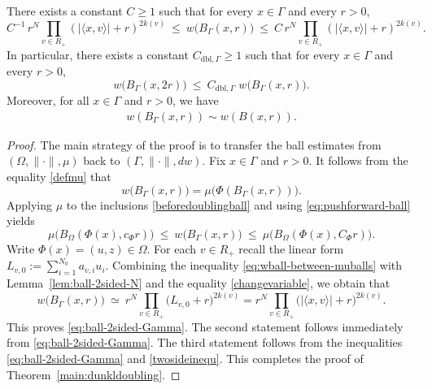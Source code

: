 \documentclass[12pt]{amsart}
\begin{document}
\begin{theorem}\label{main:dunkldoubling}
There exists a constant $C\ge 1$ such that
for every $x\in\Gamma$ and every $r>0$,
\begin{equation}\label{eq:ball-2sided-Gamma}
C^{-1}\,r^N \prod_{v \in R_+}(|\langle x, v \rangle |+r)^{2k(v)}
\ \le\
w\big(B_\Gamma(x,r)\big)
\ \le\
C\,r^N \prod_{v \in R_+}(|\langle x, v \rangle |+r)^{2k(v)}.
\end{equation}
In particular, there exists a constant $C_{\mathrm{dbl},\Gamma}\geq 1$ such that for every $x\in\Gamma$ and every $r>0$,
\[
w\big(B_\Gamma(x,2r)\big)\ \le\ C_{\mathrm{dbl},\Gamma}\;w\big(B_\Gamma(x,r)\big).
\]
Moreover, for all $x\in\Gamma$ and $r>0$, we have
\begin{align}\label{globallocalvol}
w(B_\Gamma(x,r))\sim w(B(x,r)).
\end{align}
\end{theorem}
\begin{proof}
The main strategy of the proof is to transfer the ball estimates from $(\Omega,\|\cdot\|,\mu)$ back to $(\Gamma,\|\cdot\|,dw)$. Fix $x\in\Gamma$ and $r>0$. It follows from the equality \eqref{defmu} that
\begin{equation}\label{eq:pushforward-ball}
w\big(B_\Gamma(x,r)\big)=\mu\big(\Phi(B_\Gamma(x,r))\big).
\end{equation}
Applying $\mu$ to the inclusions \eqref{beforedoublingball} and using \eqref{eq:pushforward-ball} yields
\begin{equation}\label{eq:wball-between-muballs}
\mu\big(B_{\Omega}(\Phi(x),c_\Phi r)\big)
\ \le\
w\big(B_\Gamma(x,r)\big)
\ \le\
\mu\big(B_{\Omega}(\Phi(x),C_\Phi r)\big).
\end{equation}
Write $\Phi(x)=(u,z)\in\Omega$. For each $v\in R_+$ recall the linear form
$L_{v,0}:=\sum_{i=1}^{N_0}a_{v,i}u_i$.
Combining the inequality \eqref{eq:wball-between-muballs} with Lemma~\ref{lem:ball-2sided-N} and the equality \eqref{changevariable}, we obtain that
\begin{equation}\label{eq:wball-in-terms-of-L}
w\big(B_\Gamma(x,r)\big)\ \simeq\ r^N\prod_{v\in R_+}\big(L_{v,0}+r\big)^{2k(v)}=r^N\prod_{v\in R_+}\big(|\langle x,v\rangle|+r\big)^{2k(v)}.
\end{equation}
This proves \eqref{eq:ball-2sided-Gamma}. The second statement follows immediately from \eqref{eq:ball-2sided-Gamma}. The third statement follows from the inequalities \eqref{eq:ball-2sided-Gamma} and \eqref{twosideinequ}. This completes the proof of Theorem~\ref{main:dunkldoubling}.
\end{proof}
\end{document}
